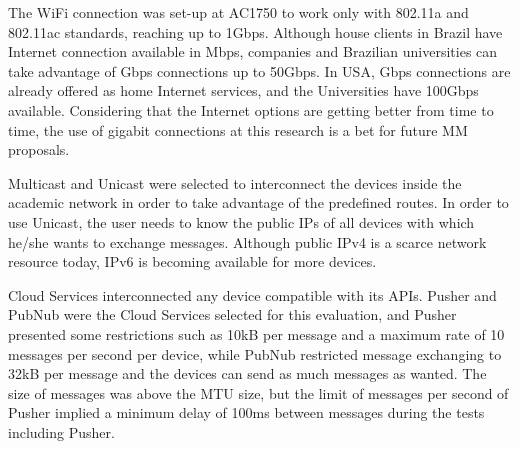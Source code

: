 The WiFi connection was set-up at AC1750 to work only with 802.11a and 802.11ac standards, reaching up to 1Gbps.
Although house clients in Brazil have Internet connection available in Mbps, companies and Brazilian universities can take advantage of Gbps connections up to 50Gbps.
In USA, Gbps connections are already offered as home Internet services, and the Universities have 100Gbps available.
Considering that the Internet options are getting better from time to time, the use of gigabit connections at this research is a bet for future MM proposals.

Multicast and Unicast were selected to interconnect the devices inside the academic network in order to take advantage of the predefined routes.
In order to use Unicast, the user needs to know the public IPs of all devices with which he/she wants to exchange messages.
Although public IPv4 is a scarce network resource today, IPv6 is becoming available for more devices.

Cloud Services 
interconnected any device compatible with its APIs.
Pusher and PubNub were the Cloud Services selected for this evaluation, and 
Pusher presented some restrictions such as 10kB per message and a maximum rate of 10 messages per second per device, while PubNub restricted message exchanging to 32kB per message and the devices can send as much messages as wanted.
The size of messages was above the MTU size, but the limit of messages per second of Pusher implied a minimum delay of 100ms between messages during the tests including Pusher.

